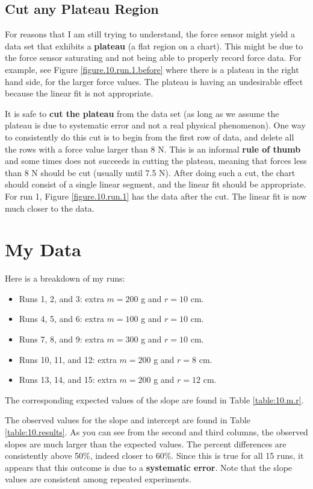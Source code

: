 \subsection{Cut any Plateau Region}
%
For reasons that I am still trying to understand, the force sensor might yield a data set that exhibits a \textbf{plateau} (a flat region on a chart). This might be due to the force sensor saturating and not being able to properly record force data. For example, see Figure \ref{figure.10.run.1.before} where there is a plateau in the right hand side, for the larger force values. The plateau is having an undesirable effect because the linear fit is not appropriate.

It is safe to \textbf{cut the plateau} from the data set (as long as we assume the plateau is due to systematic error and not a real physical phenomenon). One way to consistently do this cut is to begin from the first row of data, and delete all the rows with a force value larger than 8 N. This is an informal \textbf{rule of thumb} and some times does not succeeds in cutting the plateau, meaning that forces less than 8 N should be cut (usually until 7.5 N). After doing such a cut, the chart should consist of a single linear segment, and the linear fit should be appropriate. For run 1, Figure \ref{figure.10.run.1} has the data after the cut. The linear fit is now much closer to the data.
%
\section{My Data}
%
Here is a breakdown of my runs:
\begin{itemize}
    \item Runs 1, 2, and 3: extra $m = 200$ g and $r = 10$ cm.
    \item Runs 4, 5, and 6: extra $m = 100$ g and $r = 10$ cm.
    \item Runs 7, 8, and 9: extra $m = 300$ g and $r = 10$ cm.
    \item Runs 10, 11, and 12: extra $m = 200$ g and $r = 8$ cm.
    \item Runs 13, 14, and 15: extra $m = 200$ g and $r = 12$ cm.
\end{itemize}
The corresponding expected values of the slope are found in Table \ref{table:10.m.r}.

The observed values for the slope and intercept are found in Table \ref{table:10.results}. As you can see from the second and third columns, the observed slopes are much larger than the expected values. The percent differences are consistently above 50\%, indeed closer to 60\%. Since this is true for all 15 runs, it appears that this outcome is due to a \textbf{systematic error}. Note that the slope values are consistent among repeated experiments.

